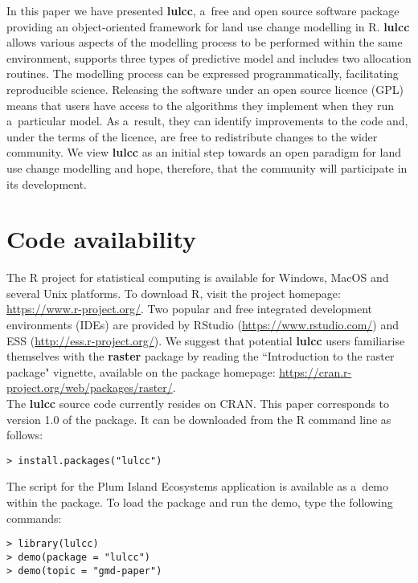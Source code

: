 \documentclass[gmdd, online, hvmath]{copernicus}
\begin{document}
\conclusions
In this paper we have presented \textbf{lulcc}, a~free and open source software package providing an object-oriented framework for land use change modelling in R. \textbf{lulcc} allows various aspects of the modelling process to be performed within the same environment, supports three types of predictive model and includes two allocation routines. The modelling process can be expressed programmatically, facilitating reproducible science. Releasing the software under an open source licence (GPL) means that users have access to the algorithms they implement when they run a~particular model. As a~result, they can identify improvements to the code and, under the terms of the licence, are free to redistribute changes to the wider community. We view \textbf{lulcc} as an initial step towards an open paradigm for land use change modelling and hope, therefore, that the community will participate in its development. \\

\section*{Code availability}
The R project for statistical computing is available for Windows, MacOS and several Unix platforms. To download R, visit the project homepage: \url{https://www.r-project.org/}. Two popular and free integrated development environments (IDEs) are provided by RStudio (\url{https://www.rstudio.com/}) and ESS (\url{http://ess.r-project.org/}). We suggest that potential \textbf{lulcc} users familiarise themselves with the \textbf{raster} package by reading the ``Introduction to the raster package" vignette, available on the package homepage: \url{https://cran.r-project.org/web/packages/raster/}. \\

The \textbf{lulcc} source code currently resides on CRAN. This paper corresponds to version 1.0 of the package. It can be downloaded from the R command line as follows:
\begin{verbatim}
> install.packages("lulcc")
\end{verbatim}\hack{\noindent}\noindent The script for the Plum Island Ecosystems application is available as a~demo within the package. To load the package and run the demo, type the following commands:
\begin{verbatim}
> library(lulcc)
> demo(package = "lulcc")
> demo(topic = "gmd-paper")
\end{verbatim}
\end{document}
